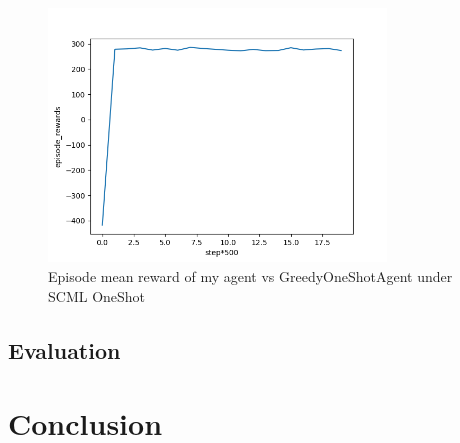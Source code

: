 \begin{figure}[htbp]
\centering
\includegraphics[width=0.80\textwidth]{./images/oneshot_my_vs_greedy.png}
\caption{Episode mean reward of my agent vs GreedyOneShotAgent under SCML OneShot}
\label{fig:oneshot-my-vs-greedy}
\end{figure}

\subsection{Evaluation}

\section{Conclusion}